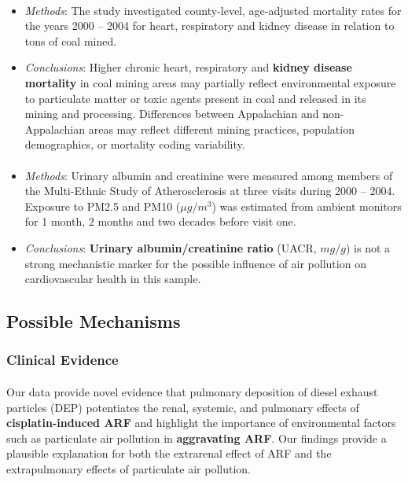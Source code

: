 \documentclass{article}
\begin{document}
\paragraph{\citet{hendryx2009mortality}}
\begin{itemize}
    \item \textit{Methods}: The study investigated county-level, age-adjusted mortality rates for the years 2000 -- 2004 for heart, respiratory and kidney disease in relation to tons of coal mined. 
    \item \textit{Conclusions}: Higher chronic heart, respiratory and \textbf{kidney disease mortality} in coal mining areas may partially reflect environmental exposure to particulate matter or toxic agents present in coal and released in its mining and processing. Differences between Appalachian and non-Appalachian areas may reflect different mining practices, population demographics, or mortality coding variability.
\end{itemize}

\paragraph{\citet{o2008airborne}}
\begin{itemize}
    \item \textit{Methods}: Urinary albumin and creatinine were measured among members of the Multi-Ethnic Study of Atherosclerosis at three visits during 2000 -- 2004. Exposure to PM2.5 and PM10 ($\mu g/m^3$) was estimated from ambient monitors for 1 month, 2 months and two decades before visit one. 
    \item \textit{Conclusions}: \textbf{Urinary albumin/creatinine ratio} (UACR, $mg/g$) is not a strong mechanistic marker for the possible influence of air pollution on cardiovascular health in this sample.
\end{itemize}

\subsection{Possible Mechanisms}

\subsubsection{Clinical Evidence}
\paragraph{\citet{nemmar2009diesel}} Our data provide novel evidence that pulmonary deposition of diesel exhaust particles (DEP) potentiates the renal, systemic, and pulmonary effects of \textbf{cisplatin-induced ARF} and highlight the importance of environmental factors such as particulate air pollution in \textbf{aggravating ARF}. Our findings provide a plausible explanation for both the extrarenal effect of ARF and the extrapulmonary effects of particulate air pollution.
\end{document}
